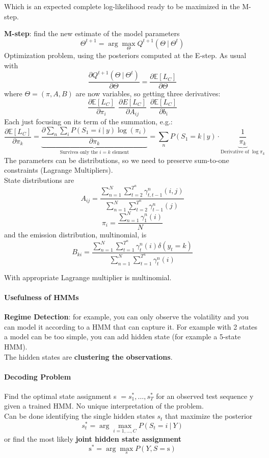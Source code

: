 \documentclass[10pt]{report}
\begin{document}
\begin{list}{}{}
	Which is an expected complete log-likelihood ready to be maximized in the M-step.
	\item \textbf{M-step}: find the new estimate of the model parameters $$\Theta^{t+1} = \arg\max_\Theta Q^{t+1}(\Theta\:|\:\Theta^t)$$
	Optimization problem, using the posteriors computed at the E-step. As usual with $$\frac{\partial Q^{t+1}(\Theta\:|\:\Theta^t)}{\partial\Theta}=\frac{\partial \mathbb{E}[L_C]}{\partial\Theta}$$
	where $\Theta = (\pi, A, B)$ are now variables, so getting three derivatives:
			$$\frac{\partial \mathbb{E}[L_C]}{\partial\pi_i}\:\:\frac{\partial E[L_C]}{\partial A_{ij}}\:\:\frac{\partial \mathbb{E}[L_C]}{\partial b_i}$$
		Each just focusing on its term of the summation, e.g.:
			$$\frac{\partial \mathbb{E}[L_C]}{\partial \pi_k}=\underset{\text{Survives only the }i=k\text{ element}}{\underbrace{\frac{\partial \sum_n\sum_iP(S_1=i\:|\:y)\log(\pi_i)}{\partial \pi_k}}} = \sum_nP(S_1=k\:|\:y)\cdot\underset{\text{Derivative of }\log\pi_k}{\underbrace{ \frac{1}{\pi_k}}}$$
	The parameters can be distributions, so we need to preserve sum-to-one constraints (Lagrange Multipliers).\\
	State distributions are
	$$A_{ij}=\frac{\sum_{n=1}^N\sum_{t=2}^{T^n} \gamma_{t,t-1}^n(i,j)}{\sum_{n=1}^N\sum_{t=2}^{T^n}\gamma_{t-1}^n(j)}$$
	$$\pi_i=\frac{\sum_{n=1}^N\gamma_1^n(i)}{N}$$
	and the emission distribution, multinomial, is
	$$B_{ki} = \frac{\sum_{n=1}^N\sum_{t=1}^{T^n}\gamma_t^n(i)\delta(y_t=k)}{\sum_{n=1}^N\sum_{t=1}^{T^n}\gamma_t^n(i)}$$
\end{list}
With appropriate Lagrange multiplier is multinomial.
\paragraph{Usefulness of HMMs}\begin{list}{}{}
	\item \textbf{Regime Detection}: for example, you can only observe the volatility and you can model it according to a HMM that can capture it. For example with 2 states a model can be too simple, you can add hidden state (for example a 5-state HMM).\\
	The hidden states are \textbf{clustering the observations}.
\end{list}
\paragraph{Decoding Problem} Find the optimal state assignment s $= s_1^*,\ldots,s_T^*$ for an observed test sequence y given a trained HMM. No unique interpretation of the problem.\\
Can be done identifying the single hidden states $s_t$ that maximize the posterior $$s_t^*=\arg\max_{i=1,\ldots,C}P(S_t=i\:|\:Y)$$ 
or find the most likely \textbf{joint hidden state assignment} 
$$\text{s}^* = \arg\max_s P(Y,S = \text{s})$$
\end{document}
